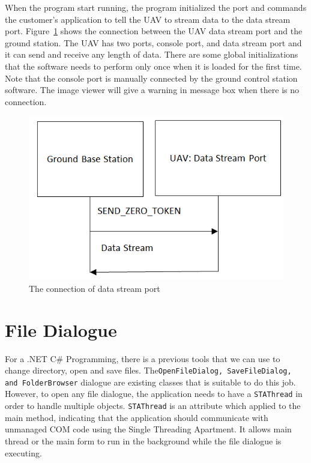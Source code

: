 When the program start running, the program initialized the port and commands the customer’s application to tell the UAV to stream data to the data stream port. Figure~\ref{GCS_connect_command} shows the connection between the UAV data stream port and the ground station. The UAV has two ports, console port, and data stream port and it can send and receive any length of data. There are some global initializations that the software needs to perform only once when it is loaded for the first time. Note that the console port is manually connected by the ground control station software. The image viewer will give a warning in message box when there is no connection.

\begin{figure}[!hbtp]
\begin{center}
\includegraphics[scale=0.5]{figures/connect_command.png} 
\end{center}
\caption{The connection of data stream port\label{GCS_connect_command}}
\end{figure}

\section{File Dialogue}
For a .NET C\# Programming, there is a previous tools that we can use to change directory, open and save files. The\texttt{OpenFileDialog,  SaveFileDialog, and FolderBrowser} dialogue are existing classes that is suitable to do this job. However, to open any file dialogue, the application needs to have a \texttt{STAThread} in order to handle multiple objects. \texttt{STAThread} is an attribute which applied to the main method, indicating that the application should communicate with unmanaged COM code using the Single Threading Apartment. It allows main thread or the main form to run in the background while the file dialogue is executing. 


